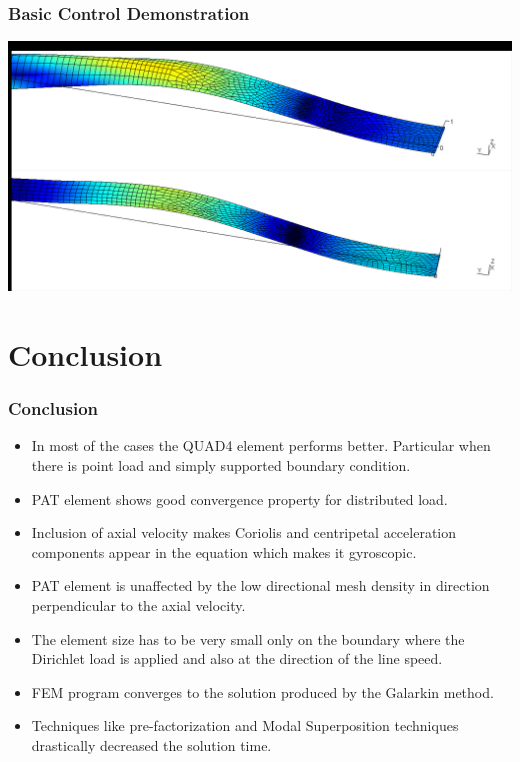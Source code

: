\documentclass[9pt]{beamer}
\begin{document}
\begin{frame}
\frametitle{Basic Control Demonstration}
\href{run:images/control_demo.mpg}{\includegraphics[width=1.0\textwidth,trim={0.5cm 11cm 0.1cm 1cm},clip]{images/control_demo.png}}

\begin{figure}[h!]
\centering

\end{figure}

\end{frame}


%
%


\section{Conclusion}
\begin{frame}\frametitle{Conclusion}

\begin{itemize}
\item In most of the cases the QUAD4 element performs better. Particular when there is point load and simply supported boundary condition.
\item PAT element shows good convergence property for distributed load.
\item Inclusion of axial velocity makes Coriolis and centripetal acceleration components appear in the equation which makes it gyroscopic.
\item PAT element is unaffected by the low directional mesh density in direction perpendicular to the axial velocity. 
\item The element size has to be very small only on the boundary where the Dirichlet load is applied and also at the direction of the
line speed.
\item FEM program converges to the solution produced by the Galarkin method. 
\item Techniques like pre-factorization and Modal Superposition techniques drastically decreased the solution time.
\end{itemize}

\end{frame}
\end{document}

